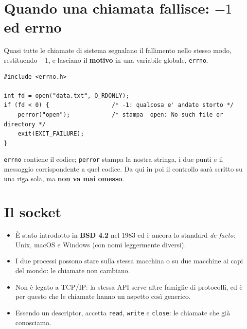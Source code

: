 
\section{Quando una chiamata fallisce: $-1$ ed errno}

Quasi tutte le chiamate di sistema segnalano il fallimento nello stesso modo, restituendo $-1$, e lasciano il
\textbf{motivo} in una variabile globale, \texttt{errno}.

\begin{lstlisting}[language={[POSIX]C}]
#include <errno.h>

int fd = open("data.txt", O_RDONLY);
if (fd < 0) {                  /* -1: qualcosa e' andato storto */
    perror("open");            /* stampa  open: No such file or directory */
    exit(EXIT_FAILURE);
}
\end{lstlisting}

\texttt{errno} contiene il codice; \texttt{perror} stampa la nostra stringa, i due punti e il messaggio corrispondente
a quel codice. Da qui in poi il controllo sarà scritto su una riga sola, ma \textbf{non va mai omesso}.

\section{Il socket}


\begin{itemize}
    \item È stato introdotto in \textbf{BSD 4.2} nel 1983 ed è ancora lo standard \emph{de facto}: Unix, macOS e Windows
          (con nomi leggermente diversi).
    \item I due processi possono stare sulla stessa macchina o su due macchine ai capi del mondo: le chiamate non cambiano.
    \item Non è legato a TCP/IP: la stessa API serve altre famiglie di protocolli, ed è per questo che le chiamate hanno un
          aspetto così generico.
    \item Essendo un descriptor, accetta \texttt{read}, \texttt{write} e \texttt{close}: le chiamate che già conosciamo.
\end{itemize}


